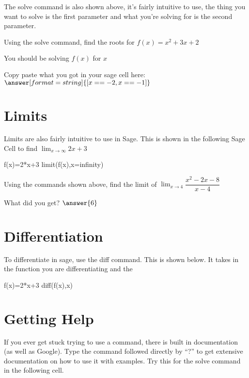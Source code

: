 \documentclass{ximera}
\begin{document}
The solve command is also shown above, it's fairly intuitive to use, the thing you want to solve is the first parameter and what you're solving for is the second parameter.
\begin{question}
Using the solve command, find the roots for $f(x)=x^2+3x+2$
\begin{hint}
You should be solving $f(x)$ for $x$
\end{hint}
\begin{onlineOnly}
\begin{sageCell}

\end{sageCell}
\end{onlineOnly}
Copy paste what you got in your sage cell here: $\answer[format=string]{[x == -2, x == -1]}$
\end{question}

\section{Limits}
Limits are also fairly intuitive to use in Sage. This is shown in the following Sage Cell to find $\displaystyle\lim_{x \to \infty}2x+3$
\begin{onlineOnly}
\begin{sageCell}
f(x)=2*x+3
limit(f(x),x=infinity)
\end{sageCell}
\end{onlineOnly}
\begin{question}
Using the commands shown above, find the limit of $\displaystyle\lim_{x \to 4}\dfrac{x^2-2x-8}{x-4}$
\begin{onlineOnly}
\begin{sageCell}

\end{sageCell}
\end{onlineOnly}
What did you get?
$\answer{6}$
\end{question}

\section{Differentiation}
To differentiate in sage, use the diff command. This is shown below. It takes in the function you are differentiating and the 
\begin{onlineOnly}
\begin{sageCell}
f(x)=2*x+3
diff(f(x),x)
\end{sageCell}
\end{onlineOnly}
\section{Getting Help}
If you ever get stuck trying to use a command, there is built in documentation (as well as Google). Type the command followed directly by ``?'' to get extensive documentation on how to use it with examples. Try this for the solve command in the following cell.
\begin{onlineOnly}
\begin{sageCell}

\end{sageCell}
\end{onlineOnly}
\end{document}
